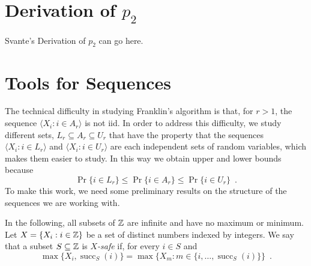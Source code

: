 \documentclass{patmorin}
\DeclareMathOperator{\cw}{succ}
\begin{document}
\section{Derivation of $p_2$}

Svante's Derivation of $p_2$ can go here.

\section{Tools for Sequences}

The technical difficulty in studying Franklin's algorithm is that, for
$r>1$, the sequence $\langle X_i:i\in A_r\rangle$ is not iid.  In order
to address this difficulty, we study different sets, $L_r\subseteq
A_r\subseteq U_r$ that have the property that the sequences $\langle X_i:i\in
L_r\rangle$ and $\langle X_i:i\in U_r\rangle$ are each independent sets
of random variables, which makes them easier to study. In this way we
obtain upper and lower bounds because
\[
    \Pr\{i\in L_r\} \le \Pr\{i\in A_r\} \le \Pr\{i\in U_r\} \enspace .
\]
To make this work, we need some preliminary results on the structure of
the sequences we are working with.

In the following, all subsets of $\mathbb{Z}$ are infinite and have no maximum
or minimum.  Let $X=\{X_i:i\in \mathbb{Z}\}$ be a set of distinct numbers indexed
by integers.  We say that a subset $S\subseteq\mathbb{Z}$ is \emph{$X$-safe}
if, for every $i\in S$ and
\[
    \max\{X_i,\cw_S(i)\} = \max\{X_m: m\in \{i,\ldots,\cw_S(i)\}\} \enspace .
\]
\end{document}
